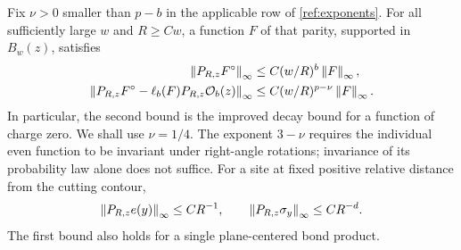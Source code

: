 \begin{proposition}\label{ref:operator}
Fix $\nu>0$ smaller than $p-b$ in the applicable row of
\eqref{ref:exponents}.  For all sufficiently large $w$ and $R\ge Cw$, a
function $F$ of that parity, supported in $B_w(z)$, satisfies
\begin{align}
 \left\lVert P_{R,z}F^\circ\right\rVert_\infty
   &\le C(w/R)^b\left\lVert F\right\rVert_\infty,\label{ref:ordinary-decay}\\
 \left\lVert P_{R,z}F^\circ-\ell_b(F)P_{R,z}\mathcal O_b(z)\right\rVert_\infty
   &\le C(w/R)^{p-\nu}\left\lVert F\right\rVert_\infty.
   \label{ref:improved-decay}
\end{align}
In particular, the second bound is the improved decay bound for a function
of charge zero.  We shall use $\nu=1/4$.  The exponent $3-\nu$ requires
the individual even function to be invariant under right-angle rotations;
invariance of its probability law alone does not suffice.
For a site at fixed positive relative distance from the cutting contour,
\begin{equation}\label{ref:microscopic-decay}
 \left\lVert P_{R,z}e(y)\right\rVert_\infty\le CR^{-1},\qquad
 \left\lVert P_{R,z}\sigma_y\right\rVert_\infty\le CR^{-d}.
\end{equation}
The first bound also holds for a single plane-centered bond product.
\end{proposition}

